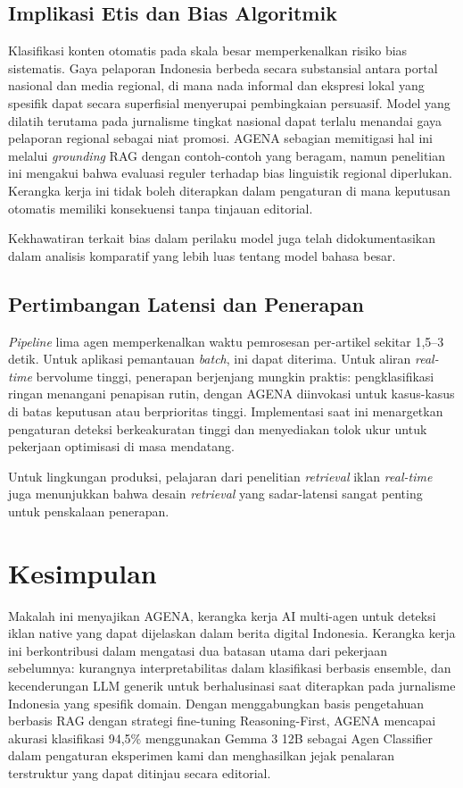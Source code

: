 \documentclass{ieeeaccess}
\begin{document}
\subsection{Implikasi Etis dan Bias Algoritmik}
Klasifikasi konten otomatis pada skala besar memperkenalkan risiko bias sistematis. Gaya pelaporan Indonesia berbeda secara substansial antara portal nasional dan media regional, di mana nada informal dan ekspresi lokal yang spesifik dapat secara superfisial menyerupai pembingkaian persuasif. Model yang dilatih terutama pada jurnalisme tingkat nasional dapat terlalu menandai gaya pelaporan regional sebagai niat promosi. AGENA sebagian memitigasi hal ini melalui \textit{grounding} RAG dengan contoh-contoh yang beragam, namun penelitian ini mengakui bahwa evaluasi reguler terhadap bias linguistik regional diperlukan. Kerangka kerja ini tidak boleh diterapkan dalam pengaturan di mana keputusan otomatis memiliki konsekuensi tanpa tinjauan editorial.

Kekhawatiran terkait bias dalam perilaku model juga telah didokumentasikan dalam analisis komparatif yang lebih luas tentang model bahasa besar.

\subsection{Pertimbangan Latensi dan Penerapan}
\textit{Pipeline} lima agen memperkenalkan waktu pemrosesan per-artikel sekitar 1,5--3 detik. Untuk aplikasi pemantauan \textit{batch}, ini dapat diterima. Untuk aliran \textit{real-time} bervolume tinggi, penerapan berjenjang mungkin praktis: pengklasifikasi ringan menangani penapisan rutin, dengan AGENA diinvokasi untuk kasus-kasus di batas keputusan atau berprioritas tinggi. Implementasi saat ini menargetkan pengaturan deteksi berkeakuratan tinggi dan menyediakan tolok ukur untuk pekerjaan optimisasi di masa mendatang.

Untuk lingkungan produksi, pelajaran dari penelitian \textit{retrieval} iklan \textit{real-time} juga menunjukkan bahwa desain \textit{retrieval} yang sadar-latensi sangat penting untuk penskalaan penerapan.

\section{Kesimpulan}
\label{sec:conclusion}
Makalah ini menyajikan AGENA, kerangka kerja AI multi-agen untuk deteksi iklan native yang dapat dijelaskan dalam berita digital Indonesia. Kerangka kerja ini berkontribusi dalam mengatasi dua batasan utama dari pekerjaan sebelumnya: kurangnya interpretabilitas dalam klasifikasi berbasis ensemble, dan kecenderungan LLM generik untuk berhalusinasi saat diterapkan pada jurnalisme Indonesia yang spesifik domain. Dengan menggabungkan basis pengetahuan berbasis RAG dengan strategi fine-tuning Reasoning-First, AGENA mencapai akurasi klasifikasi 94,5\% menggunakan Gemma 3 12B sebagai Agen Classifier dalam pengaturan eksperimen kami dan menghasilkan jejak penalaran terstruktur yang dapat ditinjau secara editorial.
\end{document}
